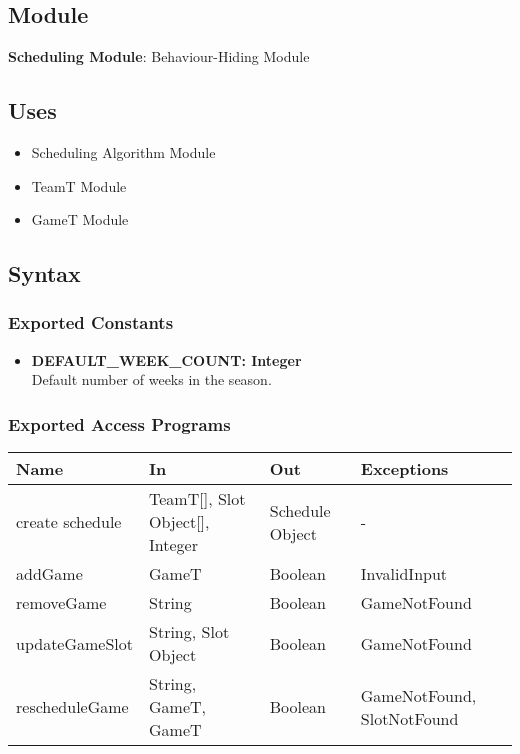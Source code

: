 \documentclass[12pt, titlepage]{article}
\begin{document}
\subsection{Module}
\textbf{Scheduling Module}: Behaviour-Hiding Module

\subsection{Uses}
\begin{itemize}
    \item Scheduling Algorithm Module
    \item TeamT Module
    \item GameT Module
\end{itemize}

\subsection{Syntax}

\subsubsection{Exported Constants}
\begin{itemize}
    \item \textbf{DEFAULT\_WEEK\_COUNT: Integer} \\ Default number of weeks in the season.
\end{itemize}

\subsubsection{Exported Access Programs}
\begin{center}
  \begin{tabular}{|p{4cm}| p{4cm}| p{4cm} | p{3cm}|}
  \hline
  \textbf{Name} & \textbf{In} & \textbf{Out} & \textbf{Exceptions} \\
  \hline
  create schedule & TeamT[], Slot Object[], Integer & Schedule Object & - \\
  addGame & GameT & Boolean & InvalidInput \\
  removeGame & String & Boolean & GameNotFound \\
  updateGameSlot & String, Slot Object & Boolean & GameNotFound \\
  rescheduleGame & String, GameT, GameT & Boolean & GameNotFound, SlotNotFound \\
  \hline
  \end{tabular}
\end{center}
\end{document}

